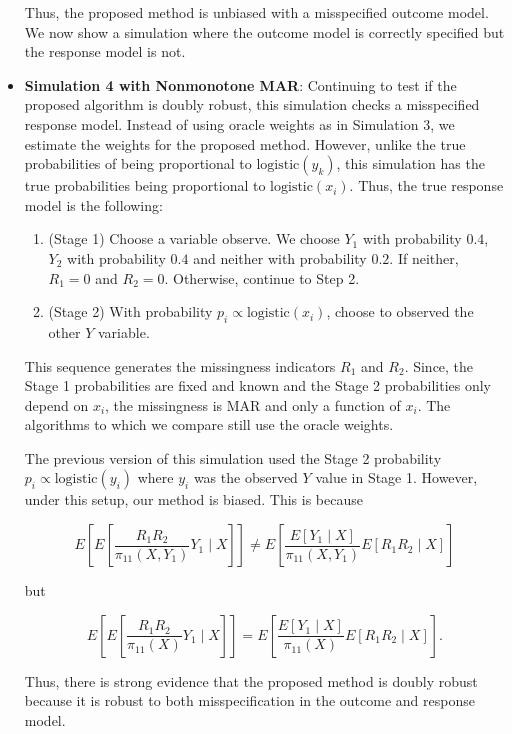\documentclass[12pt]{article}
\newcommand{\logistic}{{\text{logistic}}}
\begin{document}
\begin{itemize}
    
    
    

    \newpage

    Thus, the proposed method is unbiased with a misspecified outcome model.
    We now show a simulation where the outcome model is correctly specified but
    the response model is not.

  \item \textbf{Simulation 4 with Nonmonotone MAR}:
    Continuing to test if the proposed algorithm is doubly robust, this
    simulation checks a misspecified response model. Instead of using oracle
    weights as in Simulation 3, we estimate the weights for the proposed method.
    However, unlike the true probabilities of being proportional to
    $\logistic(y_k)$, this simulation has the true probabilities being
    proportional to $\logistic(x_i)$. Thus, the true response model is the
    following:

    \begin{enumerate}
      \item (Stage 1) Choose a variable observe. We choose $Y_1$ with
        probability $0.4$, $Y_2$ with probability $0.4$ and neither with
        probability $0.2$. If neither, $R_1 = 0$ and $R_2 = 0$. Otherwise,
        continue to Step 2.
      \item (Stage 2) With probability $p_i \propto \logistic(x_i)$, choose to
        observed the other $Y$ variable. 
    \end{enumerate}

    This sequence generates the missingness indicators $R_1$ and $R_2$. Since,
    the Stage 1 probabilities are fixed and known and the Stage 2 probabilities
    only depend on $x_i$, the missingness is MAR and only a function of $x_i$.
    The algorithms to which we compare still use the oracle weights.

    
    
    

    The previous version of this simulation used the Stage 2 probability $p_i
    \propto \logistic(y_i)$ where $y_i$ was the observed $Y$ value in Stage 1.
    However, under this setup, our method is biased. This is because

    \[ E\left[E\left[\frac{R_1 R_2}{\pi_{11}(X, Y_1)} Y_1 \mid X\right]\right] 
    \neq
    E\left[\frac{E[Y_1 \mid X]}{\pi_{11}(X, Y_1)} E[R_1 R_2 \mid X]\right] \]

    but

    \[ E\left[E\left[\frac{R_1 R_2}{\pi_{11}(X)} Y_1 \mid X\right]\right] 
    =
    E\left[\frac{E[Y_1 \mid X]}{\pi_{11}(X)} E[R_1 R_2 \mid X]\right].\]

    Thus, there is strong evidence that the proposed method is 
    doubly robust because it is robust to both misspecification in the outcome
    and response model.
\end{itemize}
\end{document}
